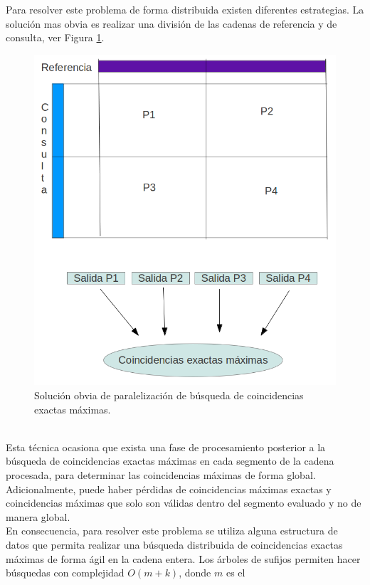 \documentclass[11pt,a4paper,english]{article}
\begin{document}
Para resolver este problema de forma distribuida existen diferentes estrategias. La 
solución mas obvia es realizar una división de las cadenas de referencia y
de consulta, ver Figura \ref{fig:para}.
\begin{figure}[h]
\begin{center}
\includegraphics[scale=0.3]{naive.png}
\caption{Solución obvia de paralelización de búsqueda de coincidencias exactas máximas.}
\label{fig:para}
\end{center}
\end{figure}
\\Esta técnica ocasiona que exista una fase de procesamiento posterior a la búsqueda de 
coincidencias exactas máximas en cada segmento de la cadena procesada, para determinar
las coincidencias máximas de forma global. Adicionalmente, puede haber pérdidas de 
coincidencias máximas exactas y coincidencias máximas que solo son válidas dentro del 
segmento evaluado y no de manera global.\\
En consecuencia, para resolver este problema se utiliza alguna estructura de datos que 
permita realizar una búsqueda distribuida de coincidencias exactas máximas de forma ágil 
en la cadena entera. Los árboles de sufijos permiten hacer 
búsquedas con complejidad $O(m+k)$, donde $m$ es el 
\end{document}
